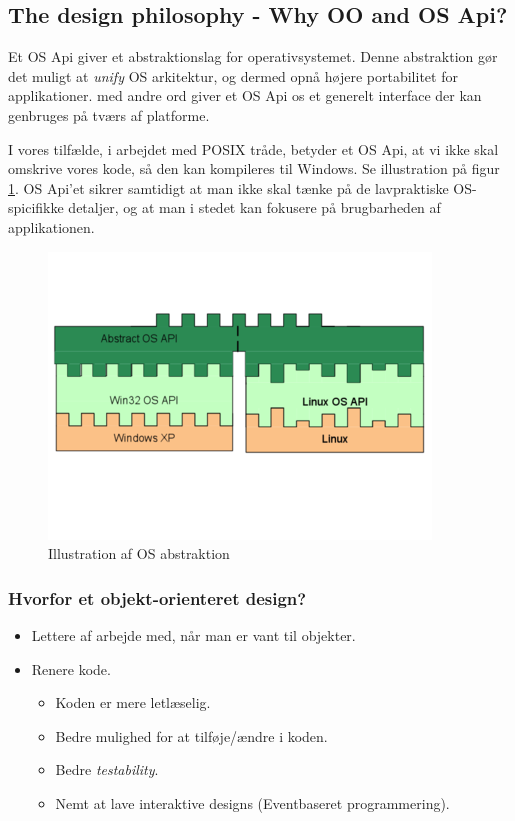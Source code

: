 \subsection{The design philosophy - Why OO and OS Api?}

Et OS Api giver et abstraktionslag for operativsystemet. Denne abstraktion gør det muligt at \textit{unify} OS arkitektur, og dermed opnå højere portabilitet for applikationer. med andre ord giver et OS Api os et generelt interface der kan genbruges på tværs af platforme.

I vores tilfælde, i arbejdet med POSIX tråde, betyder et OS Api, at vi ikke skal omskrive vores kode, så den kan kompileres til Windows. Se illustration på figur \ref{fig:ApiModel}.
OS Api'et sikrer samtidigt at man ikke skal tænke på de lavpraktiske OS-spicifikke detaljer, og at man i stedet kan fokusere på brugbarheden af applikationen.

\begin{figure}[h]
	\centering
	\includegraphics[width=0.6\linewidth]{figs/spm4/osapiModel}
	\caption{Illustration af  OS abstraktion}
	\label{fig:ApiModel}
\end{figure}

\subsubsection{Hvorfor et objekt-orienteret design?}
\begin{itemize}
	\item Lettere af arbejde med, når man er vant til objekter.
	\item Renere kode.
	\begin{itemize}
		\item Koden er mere letlæselig.
		\item Bedre mulighed for at tilføje/ændre i koden.
		\item Bedre \textit{testability}.
		\item Nemt at lave interaktive designs (Eventbaseret programmering).
	\end{itemize}
\end{itemize}

